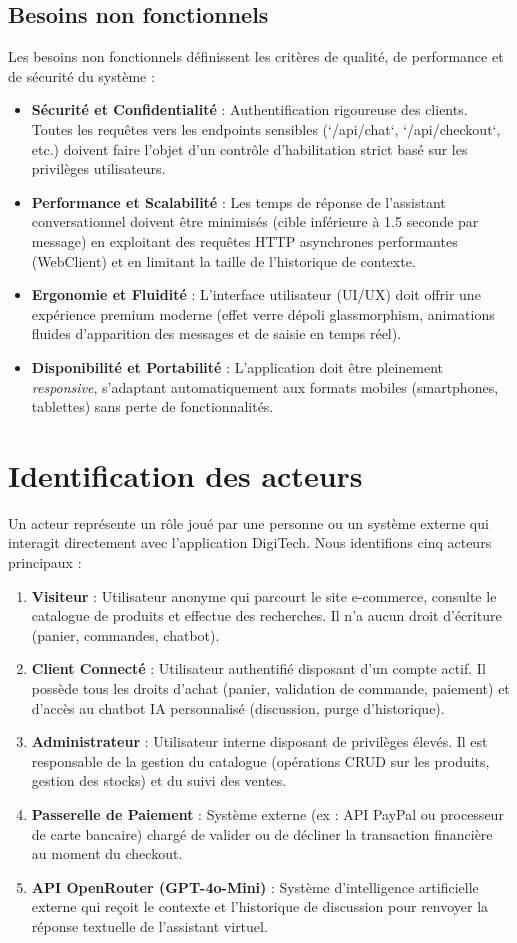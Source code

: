 \documentclass[12pt,a4paper,oneside]{report}
\begin{document}
\subsection{Besoins non fonctionnels}
Les besoins non fonctionnels définissent les critères de qualité, de performance et de sécurité du système :
\begin{itemize}
    \item \textbf{Sécurité et Confidentialité} : Authentification rigoureuse des clients. Toutes les requêtes vers les endpoints sensibles (`/api/chat`, `/api/checkout`, etc.) doivent faire l'objet d'un contrôle d'habilitation strict basé sur les privilèges utilisateurs.
    \item \textbf{Performance et Scalabilité} : Les temps de réponse de l'assistant conversationnel doivent être minimisés (cible inférieure à 1.5 seconde par message) en exploitant des requêtes HTTP asynchrones performantes (WebClient) et en limitant la taille de l'historique de contexte.
    \item \textbf{Ergonomie et Fluidité} : L'interface utilisateur (UI/UX) doit offrir une expérience premium moderne (effet verre dépoli glassmorphism, animations fluides d'apparition des messages et de saisie en temps réel).
    \item \textbf{Disponibilité et Portabilité} : L'application doit être pleinement \textit{responsive}, s'adaptant automatiquement aux formats mobiles (smartphones, tablettes) sans perte de fonctionnalités.
\end{itemize}

\section{Identification des acteurs}
Un acteur représente un rôle joué par une personne ou un système externe qui interagit directement avec l'application DigiTech. Nous identifions cinq acteurs principaux :
\begin{enumerate}
    \item \textbf{Visiteur} : Utilisateur anonyme qui parcourt le site e-commerce, consulte le catalogue de produits et effectue des recherches. Il n'a aucun droit d'écriture (panier, commandes, chatbot).
    \item \textbf{Client Connecté} : Utilisateur authentifié disposant d'un compte actif. Il possède tous les droits d'achat (panier, validation de commande, paiement) et d'accès au chatbot IA personnalisé (discussion, purge d'historique).
    \item \textbf{Administrateur} : Utilisateur interne disposant de privilèges élevés. Il est responsable de la gestion du catalogue (opérations CRUD sur les produits, gestion des stocks) et du suivi des ventes.
    \item \textbf{Passerelle de Paiement} : Système externe (ex : API PayPal ou processeur de carte bancaire) chargé de valider ou de décliner la transaction financière au moment du checkout.
    \item \textbf{API OpenRouter (GPT-4o-Mini)} : Système d'intelligence artificielle externe qui reçoit le contexte et l'historique de discussion pour renvoyer la réponse textuelle de l'assistant virtuel.
\end{enumerate}
\end{document}
